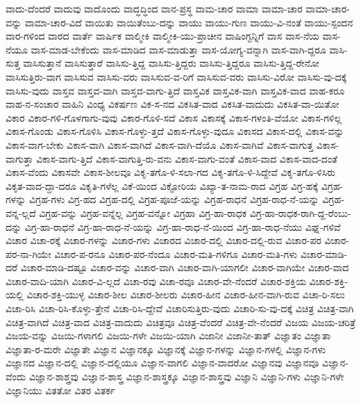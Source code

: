 {ವಾದು-ದೆಂದರೆ
ವಾದುವು
ವಾದೊಂದು
ವಾದ್ಧದ್ಧಿಂದ
ವಾನ-ಪ್ರಸ್ಥ
ವಾಮ-ಚಾರ
ವಾಮಾ
ವಾಮಾ-ಚಾರ
ವಾಮಾ-ಚಾರ-ವನ್ನು
ವಾಮಾ-ಚಾರ-ವಿದೆ
ವಾಯಿತು
ವಾಯಿತೆಂಬು-ದನ್ನು
ವಾಯು
ವಾಯು-ಗುಣ
ವಾಯು-ವಿ-ನಂತೆ
ವಾಯು-ಸ್ಪಂದನ
ವಾರ-ಗಳಿಂದ
ವಾರದ
ವಾರ್ತೆ
ವಾರ್ಷಿಕ
ವಾಲ್ಮೀಕಿ
ವಾಲ್ಮೀಕಿ-ಯು-ಪ್ರಾಚೀನ
ವಾಷಿಂಗ್ಟನ್ನಿಗೆ
ವಾಸ
ವಾಸ-ನೆಯ
ವಾಸ-ನೆಯೂ
ವಾಸ-ಮಾಡ-ಬೇಕೆಂದು
ವಾಸ-ಮಾಡಿದ
ವಾಸ-ಮಾಡುತ್ತಾ
ವಾಸ-ಯೋಗ್ಯ-ವನ್ನಾಗಿ
ವಾಸ-ವಾಗಿ-ದ್ದರೂ
ವಾಸಿ-ಸುತ್ತ
ವಾಸಿಸುತ್ತಾನೆ
ವಾಸಿಸುತ್ತಾರೆ
ವಾಸಿಸು-ತ್ತಿದ್ದ
ವಾಸಿಸು-ತ್ತಿದ್ದರು
ವಾಸಿಸು-ತ್ತಿದ್ದರೂ
ವಾಸಿಸು-ತ್ತಿದ್ದ-ರೇನೋ
ವಾಸಿಸುತ್ತಿರು-ವಾಗ
ವಾಸಿಸುವ
ವಾಸಿಸು-ವರು
ವಾಸಿಸುವ-ವ-ರಿಗೆ
ವಾಸಿಸುವ-ವರು
ವಾಸಿಸು-ವಿರೋ
ವಾಸಿಸು-ವು-ದಕ್ಕೆ
ವಾಸಿಸು-ವುದು
ವಾಸ್ತವ
ವಾಸ್ತವ-ವಾಗಿ
ವಾಸ್ತವ-ವಾಗು-ತ್ತಿದೆ
ವಾಸ್ತವಿಕ
ವಾಸ್ತವಿಕ-ವಾಗಿ
ವಾಸ್ತವಿಕ-ವಾದ
ವಾಹ-ಕರೂ
ವಾಹ-ನ-ಸಂಚಾರ
ವಾಹಿನಿ
ವಿಂಧ್ಯ
ವಿಕರ್ಷಣ
ವಿಕ-ಸ-ನದ
ವಿಕಸಿತ-ವಾದ
ವಿಕಸಿತ-ವಾದುದು
ವಿಕಸಿತ-ವಾ-ಯಿತೋ
ವಿಕಾರ
ವಿಕಾರ-ಗಳಿ-ಗೊಳಗಾಗು-ವುವು
ವಿಕಾರ-ಗೊಳಿ-ಸದೆ
ವಿಕಾಸ
ವಿಕಾಸಕ್ಕೆ
ವಿಕಾಸ-ಗಳಂತಿ-ವೆಯೋ
ವಿಕಾಸ-ಗಳಿಲ್ಲ
ವಿಕಾಸ-ಗೊಂಡು
ವಿಕಾಸ-ಗೊಳಿಸಿ
ವಿಕಾಸ-ಗೊಳ್ಳು-ತ್ತದೆ
ವಿಕಾಸ-ಗೊಳ್ಳು-ವುದೂ
ವಿಕಾಸದ
ವಿಕಾಸ-ದಲ್ಲಿ
ವಿಕಾಸ-ವನ್ನು
ವಿಕಾಸ-ವಾಗ-ಬೇಕು
ವಿಕಾಸ-ವಾಗಿ
ವಿಕಾಸ-ವಾಗಿದೆ
ವಿಕಾಸ-ವಾಗಿ-ದೆಯೊ
ವಿಕಾಸ-ವಾಗಿವೆ
ವಿಕಾಸ-ವಾಗುತ್ತ
ವಿಕಾಸ-ವಾಗುತ್ತಾ
ವಿಕಾಸ-ವಾಗು-ತ್ತಿದೆ
ವಿಕಾಸ-ವಾಗುತ್ತಿ-ರು-ವನು
ವಿಕಾಸ-ವಾಗು-ವಂತೆ
ವಿಕಾಸ-ವಾದ
ವಿಕಾಸ-ವಾದ-ದಂತೆ
ವಿಕಾಸ-ವೆಂದು
ವಿಕಾಸವೇ
ವಿಕಾಸ-ಶೀಲವೂ
ವಿಕೃ-ತಗೊ-ಳಿ-ಸಲಾ-ಗದ
ವಿಕೃ-ತಗೊ-ಳಿ-ಸಿದ್ದೇವೆ
ವಿಕೃ-ತಗೊ-ಳಿಸಿರು
ವಿಕೃತ-ವಾದ-ದ್ದಾ-ದರೂ
ವಿಕೃತಿ-ಗಳೆಲ್ಲ
ವಿಕೆ-ಯಿಂದ
ವಿಕ್ಟೋರಿಯ
ವಿಖ್ಯಾ-ತ-ನಾಮ-ರಾದ
ವಿಗ್ರಹ
ವಿಗ್ರ-ಹಕ್ಕೆ
ವಿಗ್ರಹ-ಗಳನ್ನು
ವಿಗ್ರಹ-ಗಳು
ವಿಗ್ರ-ಹದ
ವಿಗ್ರಹ-ದಲ್ಲಿ
ವಿಗ್ರಹ-ಪೂಜೆ-ಯನ್ನು
ವಿಗ್ರಹ-ರಾಧನೆ
ವಿಗ್ರಹ-ರಾಧ-ನೆ-ಯನ್ನು
ವಿಗ್ರಹ-ವನ್ನ-ಲ್ಲದೆ
ವಿಗ್ರಹ-ವನ್ನು
ವಿಗ್ರಹ-ವನ್ನೆಲ್ಲ
ವಿಗ್ರಹ-ವನ್ನೋ
ವಿಗ್ರಹಾ
ವಿಗ್ರ-ಹಾ-ರಾಧಕ
ವಿಗ್ರ-ಹಾ-ರಾಧಕ-ರಾಗಿ-ದ್ದ-ರೆಂಬು-ದನ್ನು
ವಿಗ್ರ-ಹಾ-ರಾಧನೆ
ವಿಗ್ರ-ಹಾ-ರಾಧ-ನೆ-ಯನ್ನು
ವಿಗ್ರ-ಹಾ-ರಾಧ-ನೆ-ಯಿಂದ
ವಿಗ್ರ-ಹಾ-ರಾಧ-ನೆಯು
ವಿಘ್ನ-ಗಳಿವೆ
ವಿಚಾರ
ವಿಚಾ-ರಕ್ಕೆ
ವಿಚಾರ-ಗಳನ್ನು
ವಿಚಾರ-ಗಳು
ವಿಚಾರದ
ವಿಚಾರ-ದಲ್ಲಿ
ವಿಚಾರ-ದಲ್ಲಿ-ರುವ
ವಿಚಾರ-ಪರ
ವಿಚಾರ-ಪರ-ನಾ-ಗಿಯೇ
ವಿಚಾರ-ಪ-ರನೂ
ವಿಚಾರ-ಪರ-ನೆಂದೂ
ವಿಚಾರ-ಮತಿ-ಗಳಿಗೂ
ವಿಚಾರ-ಮತಿ-ಗಳು
ವಿಚಾರ-ಮಾಡಿ-ದರೆ
ವಿಚಾರ-ಮಾಡಿ-ದಷ್ಟೂ
ವಿಚಾರ-ವನ್ನು
ವಿಚಾರ-ವಾಗಿ
ವಿಚಾರ-ವಾಗಿ-ಯಾಗಲೀ
ವಿಚಾರ-ವಾಗಿಯೇ
ವಿಚಾರ-ವಾದ
ವಿಚಾರ-ವಾದಿ-ಯಾಗಿ
ವಿಚಾರ-ವಿ-ಲ್ಲದೆ
ವಿಚಾ-ರವು
ವಿಚಾ-ರವೂ
ವಿಚಾರ-ವೇ-ನೆಂದರೆ
ವಿಚಾರ-ಶಕ್ತಿಯ
ವಿಚಾರ-ಶಕ್ತಿ-ಯಲ್ಲಿ
ವಿಚಾರ-ಶಕ್ತಿ-ಯುಳ್ಳ
ವಿಚಾರ-ಶೀಲ
ವಿಚಾರ-ಶೀಲರು
ವಿಚಾರ-ಹೀನ
ವಿಚಾರ-ಹೀನ-ವಾಗಿ-ರುವ
ವಿಚಾ-ರಿ-ಸಲು
ವಿಚಾ-ರಿಸಿ
ವಿಚಾ-ರಿಸಿ-ಕೊಳ್ಳು-ತ್ತೇನೆ
ವಿಚಾ-ರಿಸಿ-ದ್ದೇವೆ
ವಿಚಾರಿಸುತ್ತಿರು-ವುದು
ವಿಚಾರಿ-ಸು-ವು-ದಕ್ಕೆ
ವಿಚಿತ್ರ
ವಿಚಿತ್ರ-ವಾಗಿ
ವಿಚಿತ್ರ-ವಾಗಿದೆ
ವಿಚಿತ್ರ-ವಾದ
ವಿಚಿತ್ರ-ವಾದುದು
ವಿಚಿತ್ರವೂ
ವಿಚಿತ್ರ-ವೆಂದರೆ
ವಿಚಿತ್ರ-ವೇ-ನೆಂದರೆ
ವಿಜಯ
ವಿಜಯ-ಚರಿತ್ರೆ
ವಿಜಯ-ವನ್ನು
ವಿಜಯಿ-ಗಳಾಗಲಿ
ವಿಜಯಿ-ಗಳೇ
ವಿಜಯಿ-ಯಾಗಿ
ವಿಜಾನೀ
ವಿಜಾನೀ-ತಾತ್
ವಿಜ್ಞಾತಂ
ವಿಜ್ಞಾತಾ
ವಿಜ್ಞಾತಾ-ರ-ಮರೇ
ವಿಜ್ಞಾತೇ
ವಿಜ್ಞಾನ
ವಿಜ್ಞಾನಕ್ಕೂ
ವಿಜ್ಞಾನಕ್ಕೆ
ವಿಜ್ಞಾನ-ಗಳನ್ನು
ವಿಜ್ಞಾನ-ಗಳಲ್ಲಿ
ವಿಜ್ಞಾನ-ಗಳು
ವಿಜ್ಞಾನದ
ವಿಜ್ಞಾನ-ದಲ್ಲಿ
ವಿಜ್ಞಾನ-ದಲ್ಲಿಯೂ
ವಿಜ್ಞಾನ-ವಾಗಲಿ
ವಿಜ್ಞಾನ-ವಾದರೋ
ವಿಜ್ಞಾನವು
ವಿಜ್ಞಾನವೂ
ವಿಜ್ಞಾನ-ವೆಂದು
ವಿಜ್ಞಾನ-ಶಾಶ್ತ್ರವು
ವಿಜ್ಞಾನ-ಶಾಸ್ತ್ರ
ವಿಜ್ಞಾನ-ಶಾಸ್ತ್ರಕ್ಕೂ
ವಿಜ್ಞಾನ-ಶಾಸ್ತ್ರವು
ವಿಜ್ಞಾನಿ
ವಿಜ್ಞಾನಿ-ಗಳು
ವಿಜ್ಞಾನಿ-ಗಳೇ
ವಿಜ್ಞಾನಿಯು
ವಿತತೋ
ವಿತರ
ವಿತರ್ಕ
}
